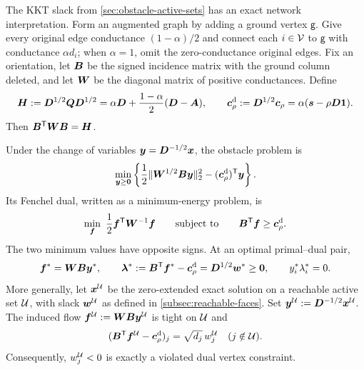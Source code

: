 The KKT slack from \cref{sec:obstacle-active-sets} has an exact network
interpretation. Form an augmented graph by
adding a ground vertex $\mathsf g$.  Give every original edge conductance
$(1-\alpha)/2$ and connect each $i\in\mathcal{V}$ to $\mathsf g$ with conductance
$\alpha d_i$; when $\alpha=1$, omit the zero-conductance original edges.  Fix
an orientation, let $\bm{B}$ be the signed incidence matrix with the ground
column deleted, and let $\bm{W}$ be the diagonal matrix of positive
conductances.  Define
\begin{equation}
 \bm{H}:=\bm{D}^{1/2}\bm{Q}\bm{D}^{1/2}
 =\alpha\bm{D}+\frac{1-\alpha}{2}(\bm{D}-\bm{A}),
 \qquad
 \bm{c}_\rho^{\mathrm d}:=\bm{D}^{1/2}\bm{c}_\rho=\alpha(\bm{s}-\rho\bm{D}\mathbf{1}).
 \label{eq:grounded-system}
\end{equation}
Then $\bm{B}^{\mathsf{T}}\bm{W}\bm{B}=\bm{H}$.

\begin{proposition}
\label{prop:grounded-flow-dual}
Under the change of variables $\bm{y}=\bm{D}^{-1/2}\bm{x}$, the obstacle problem is
\begin{equation}
 \min_{\bm{y}\geq\bm{0}}
 \left\{
  \frac12\lVert\bm{W}^{1/2}\bm{B}\bm{y}\rVert_2^2-(\bm{c}_\rho^{\mathrm d})^{\mathsf{T}}\bm{y}
 \right\}.
 \label{eq:grounded-flow-primal}
\end{equation}
Its Fenchel dual, written as a minimum-energy problem, is
\begin{equation}
 \min_{\vf}\ \frac12\vf^\trans\mW^{-1}\vf
 \qquad\text{subject to}\qquad
 \mB^\trans\vf\geq\vc_\rho^{\mathrm d}.
 \label{eq:grounded-flow-dual}
\end{equation}
The two minimum values have opposite signs.  At an optimal primal--dual pair,
\begin{equation*}
 \bm{f}^*=\bm{W}\bm{B}\bm{y}^*,
 \qquad
 \bm{\lambda}^*:=\bm{B}^{\mathsf{T}}\bm{f}^*-\bm{c}_\rho^{\mathrm d}
 =\bm{D}^{1/2}\bm{w}^*\geq\bm{0},
 \qquad
 y_i^*\lambda_i^*=0.
\end{equation*}
More generally, let $\bm{x}^{\mathcal{U}}$ be the zero-extended exact solution on a
reachable active set $\mathcal{U}$, with slack $\bm{w}^{\mathcal{U}}$ as defined in
\cref{subsec:reachable-faces}. Set $\bm{y}^{\mathcal{U}}:=\bm{D}^{-1/2}\bm{x}^{\mathcal{U}}$.
The induced flow $\bm{f}^{\mathcal{U}}:=\bm{W}\bm{B}\bm{y}^{\mathcal{U}}$ is tight on $\mathcal{U}$ and
\begin{equation*}
 (\bm{B}^{\mathsf{T}}\bm{f}^{\mathcal{U}}-\bm{c}_\rho^{\mathrm d})_j=\sqrt{d_j}\,w_j^{\mathcal{U}}
 \quad(j\notin \mathcal{U}).
\end{equation*}
Consequently, $w_j^{\mathcal{U}}<0$ is exactly a violated dual vertex constraint.
\end{proposition}

